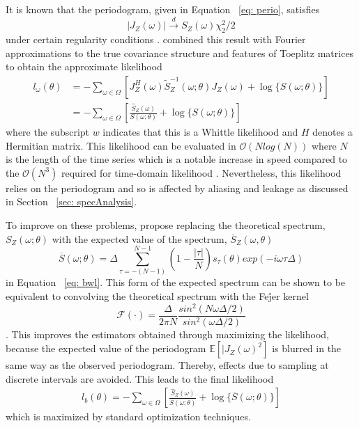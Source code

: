 \documentclass{stat572Style}
\begin{document}
 It is known that  the periodogram, given in Equation ~\ref{eq: perio}, satisfies
\begin{equation}
|J_{Z}(\omega)| \overset{d}{\rightarrow} S_{Z}(\omega) \chi^{2}_{2}/2
\end{equation}
under certain regularity conditions \citep{Contreras2006}. 
\citet{Whittle1953} combined this result with Fourier approximations to the true covariance structure and features of Toeplitz matrices to obtain the approximate likelihood
\begin{align}
l_{\omega}(\theta) &= - \sum_{\omega \in \Omega} \left[ J_{Z}^{H}(\omega) \tilde{S}_{Z}^{-1}(\omega; \theta) J_{Z}(\omega) + \log \{S(\omega; \theta) \} \right]\\
\label{eq: bwl}
&= -\sum_{\omega \in \Omega} \left[ \frac{\hat{S}_{Z}(\omega)}{S(\omega;\theta)}  + \log  \{ S(\omega; \theta) \}\right]
\end{align}
 where the subscript $w$ indicates that this is a Whittle likelihood and $H$ denotes a Hermitian matrix. 
  This likelihood can be evaluated in $\mathcal{O}(N log(N))$ where $N$ is the length of the time series which is a notable increase in speed compared to the $\mathcal{O}(N^{3})$  required for time-domain likelihood  \citep{Sykulski2016}. 
  Nevertheless, this likelihood relies on the periodogram and so is affected by aliasing and leakage as discussed in Section ~\ref{sec: specAnalysis}. 
 
To improve on these problems, \citet{Sykulski2013} propose replacing the theoretical spectrum, $S_{Z}(\omega; \theta)$ with the expected value of the spectrum, $\overline{S}_{Z}(\omega, \theta)$\begin{equation}
\overline{S}(\omega; \theta) = \Delta \sum_{\tau = - (N - 1)}^{N-1} \left(1 - \frac{|\tau|}{N} \right)s_{\tau}(\theta) exp ( - i \omega \tau \Delta)
\end{equation}
in Equation ~\ref{eq: bwl}. 
This form of the expected spectrum can be shown to be equivalent to convolving the theoretical spectrum with the Fe\'{j}er kernel 
\begin{equation}
\mathcal{F}(\cdot) = \frac{\Delta}{2\pi N} \frac{sin^{2}(N \omega \Delta/2)}{sin^{2}(\omega \Delta /2)} 
\end{equation} \citep{Sykulski2013}. 
This improves the estimators obtained through maximizing the likelihood, because the expected value of the periodogram $\mathbb{E}[|J_{Z}(\omega)^{2}]$ is blurred in the same way as the observed periodogram. Thereby, effects due to sampling at discrete intervals are avoided. 
This leads to the final likelihood
\begin{align}
l_{b}(\theta) = - \sum_{\omega \in \Omega} \left[\frac{\hat{S}_{Z}(\omega)}{\overline{S}(\omega; \theta)} + \log \{ \overline{S} (\omega; \theta) \}\right]
\end{align}
which is maximized by standard optimization techniques. 
\end{document}
